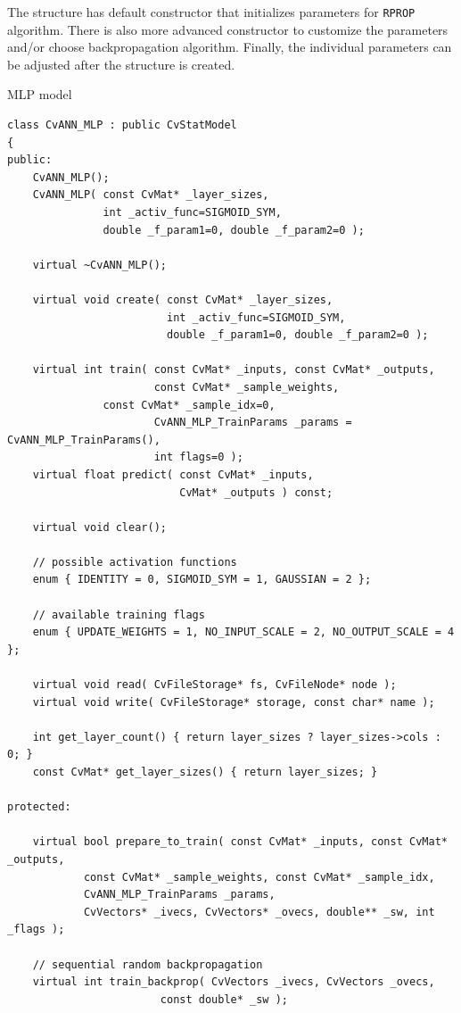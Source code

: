 The structure has default constructor that initializes parameters for \texttt{RPROP} algorithm. There is also more advanced constructor to customize the parameters and/or choose backpropagation algorithm. Finally, the individual parameters can be adjusted after the structure is created.



MLP model

\begin{lstlisting}
class CvANN_MLP : public CvStatModel
{
public:
    CvANN_MLP();
    CvANN_MLP( const CvMat* _layer_sizes,
               int _activ_func=SIGMOID_SYM,
               double _f_param1=0, double _f_param2=0 );

    virtual ~CvANN_MLP();

    virtual void create( const CvMat* _layer_sizes,
                         int _activ_func=SIGMOID_SYM,
                         double _f_param1=0, double _f_param2=0 );

    virtual int train( const CvMat* _inputs, const CvMat* _outputs,
                       const CvMat* _sample_weights, 
		       const CvMat* _sample_idx=0,
                       CvANN_MLP_TrainParams _params = CvANN_MLP_TrainParams(),
                       int flags=0 );
    virtual float predict( const CvMat* _inputs,
                           CvMat* _outputs ) const;

    virtual void clear();

    // possible activation functions
    enum { IDENTITY = 0, SIGMOID_SYM = 1, GAUSSIAN = 2 };

    // available training flags
    enum { UPDATE_WEIGHTS = 1, NO_INPUT_SCALE = 2, NO_OUTPUT_SCALE = 4 };

    virtual void read( CvFileStorage* fs, CvFileNode* node );
    virtual void write( CvFileStorage* storage, const char* name );

    int get_layer_count() { return layer_sizes ? layer_sizes->cols : 0; }
    const CvMat* get_layer_sizes() { return layer_sizes; }

protected:

    virtual bool prepare_to_train( const CvMat* _inputs, const CvMat* _outputs,
            const CvMat* _sample_weights, const CvMat* _sample_idx,
            CvANN_MLP_TrainParams _params,
            CvVectors* _ivecs, CvVectors* _ovecs, double** _sw, int _flags );

    // sequential random backpropagation
    virtual int train_backprop( CvVectors _ivecs, CvVectors _ovecs, 
						const double* _sw );


\end{lstlisting}
